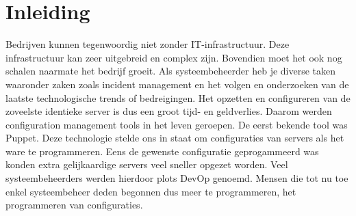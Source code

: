 
\chapter{Inleiding}
\label{ch:inleiding}




Bedrijven kunnen tegenwoordig niet zonder IT-infrastructuur. Deze infrastructuur kan zeer uitgebreid en complex zijn. Bovendien moet het ook nog schalen naarmate het bedrijf groeit. Als systeembeheerder heb je diverse taken waaronder zaken zoals incident management en het volgen en onderzoeken van de laatste technologische trends of bedreigingen. Het opzetten en configureren van de zoveelste identieke server is dus een groot tijd- en geldverlies. Daarom werden configuration management tools in het leven geroepen. De eerst bekende tool was Puppet. Deze technologie stelde ons in staat om configuraties van servers als het ware te programmeren. Eens de gewenste configuratie geprogammeerd was konden extra gelijkaardige servers veel sneller opgezet worden. Veel systeembeheerders werden hierdoor plots DevOp genoemd. Mensen die tot nu toe enkel systeembeheer deden begonnen dus meer te programmeren, het programmeren van configuraties. 








